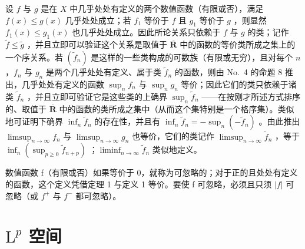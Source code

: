 设 \(f\) 与 \(g\) 是在 \(X\) 中几乎处处有定义的两个数值函数（有限或否），满足 \(f(x) \leqslant g(x)\) 几乎处处成立；若 \(f_1\) 等价于 \(f\) 且 \(g_1\) 等价于 \(g\) ，则显然 \(f_1(x) \leqslant g_1(x)\) 也几乎处处成立。因此所论关系只依赖于 \(f\) 与 \(g\) 的类；记作 \(\widetilde{f} \leqslant \widetilde{g}\) ，并且立即可以验证这个关系是取值于 \(\overline{\mathbf{R}}\) 中的函数的等价类所成之集上的一个序关系。若 \((\widetilde{f}_n)\) 是这样的一些类构成的可数族（有限或无穷），且对每个 \(n\) ，\(f_n\) 与 \(g_n\) 是两个几乎处处有定义、属于类 \(\widetilde{f}_n\) 的函数，则由 No.~4 的命题 8 推出，几乎处处有定义的函数 \(\sup_n f_n\) 与 \(\sup_n g_n\) 等价；因此它们的类只依赖于诸类 \(\widetilde{f}_n\) ，并且立即可验证它是这些类的上确界 \(\sup_n \widetilde{f}_n\) ——在按刚才所述方式排序的、取值于 \(\overline{\mathbf{R}}\) 中的函数的类所成之集中（从而这个集特别是一个格序集）。类似地可证明下确界 \(\inf_n \widetilde{f}_n\) 的存在性，并且有 \(\inf_n \widetilde{f}_n = -\sup_n (-\widetilde{f}_n)\) 。由此推出 \(\limsup_{n \to \infty} f_n\) 与 \(\limsup_{n \to \infty} g_n\) 也等价，它们的类记作 \(\limsup_{n \to \infty} \widetilde{f}_n\) ，等于 \(\inf_n (\sup_{p \geqslant 0} \widetilde{f}_{n+p})\) ；\(\liminf_{n \to \infty} \widetilde{f}_n\) 类似地定义。

数值函数 f（有限或否）如果等价于 0，就称为可忽略的；对于正的且处处有定义的函数，这个定义凭借定理 1 与定义 1 等价。要使 f 可忽略，必须且只须 \(|f|\) 可忽略（或 \(f^{+}\) 与 \(f^{-}\) 都可忽略）。

\section{\texorpdfstring{\(\mathrm{L}^{p}\) 空间}{L 的 p 次幂空间}}
